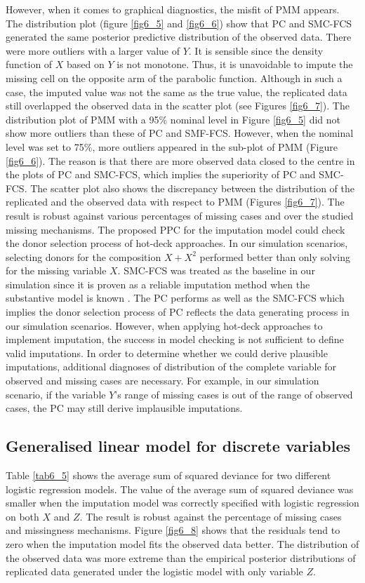 	However, when it comes to graphical diagnostics, the misfit of PMM appears. The distribution plot (figure \ref{fig6_5} and \ref{fig6_6}) show that PC and SMC-FCS generated the same posterior predictive distribution of the observed data. There were more outliers with a larger value of $Y$. It is sensible since the density function of $X$ based on $Y$ is not monotone. Thus, it is unavoidable to impute the missing cell on the opposite arm of the parabolic function. Although in such a case, the imputed value was not the same as the true value, the replicated data still overlapped the observed data in the scatter plot (see Figures \ref{fig6_7}). The distribution plot of PMM with a 95\% nominal level in Figure \ref{fig6_5} did not show more outliers than these of PC and SMF-FCS. However, when the nominal level was set to 75\%, more outliers appeared in the sub-plot of PMM (Figure \ref{fig6_6}). The reason is that there are more observed data closed to the centre in the plots of PC and SMC-FCS, which implies the superiority of PC and SMC-FCS. The scatter plot also shows the discrepancy between the distribution of the replicated and the observed data with respect to PMM (Figures \ref{fig6_7}). The result is robust against various percentages of missing cases and over the studied missing mechanisms. The proposed PPC for the imputation model could check the donor selection process of hot-deck approaches. In our simulation scenarios, selecting donors for the composition $X + X^2$ performed better than only solving for the missing variable $X$. SMC-FCS was treated as the baseline in our simulation since it is proven as a reliable imputation method when the substantive model is known \citep{bartlett2015multiple}. The PC performs as well as the SMC-FCS which implies the donor selection process of PC reflects the data generating process in our simulation scenarios. However, when applying hot-deck approaches to implement imputation, the success in model checking is not sufficient to define valid imputations. In order to determine whether we could derive plausible imputations, additional diagnoses of distribution of the complete variable for observed and missing cases are necessary. For example, in our simulation scenario, if the variable $Y$'s range of missing cases is out of the range of observed cases, the PC may still derive implausible imputations. 
	
	\subsection{Generalised linear model for discrete variables}
	Table \ref{tab6_5} shows the average sum of squared deviance for two different logistic regression models. The value of the average sum of squared deviance was smaller when the imputation model was correctly specified with logistic regression on both $X$ and $Z$. The result is robust against the percentage of missing cases and missingness mechanisms. Figure \ref{fig6_8} shows that the residuals tend to zero when the imputation model fits the observed data better. The distribution of the observed data was more extreme than the empirical posterior distributions of replicated data generated under the logistic model with only variable $Z$. 
	
